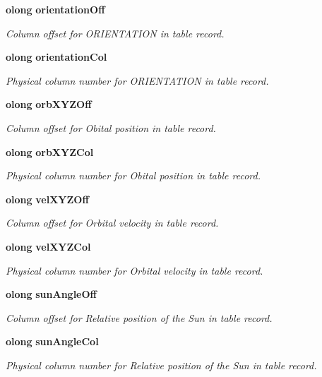 \begin{CompactItemize}
{\bf olong} {\bf orientation\-Off}
\begin{CompactList}\small\item\em Column offset for ORIENTATION in table record. \item\end{CompactList}\item 
{\bf olong} {\bf orientation\-Col}
\begin{CompactList}\small\item\em Physical column number for ORIENTATION in table record. \item\end{CompactList}\item 
{\bf olong} {\bf orb\-XYZOff}
\begin{CompactList}\small\item\em Column offset for Obital position in table record. \item\end{CompactList}\item 
{\bf olong} {\bf orb\-XYZCol}
\begin{CompactList}\small\item\em Physical column number for Obital position in table record. \item\end{CompactList}\item 
{\bf olong} {\bf vel\-XYZOff}
\begin{CompactList}\small\item\em Column offset for Orbital velocity in table record. \item\end{CompactList}\item 
{\bf olong} {\bf vel\-XYZCol}
\begin{CompactList}\small\item\em Physical column number for Orbital velocity in table record. \item\end{CompactList}\item 
{\bf olong} {\bf sun\-Angle\-Off}
\begin{CompactList}\small\item\em Column offset for Relative position of the Sun in table record. \item\end{CompactList}\item 
{\bf olong} {\bf sun\-Angle\-Col}
\begin{CompactList}\small\item\em Physical column number for Relative position of the Sun in table record. \item\end{CompactList}\item 

\end{CompactItemize}
